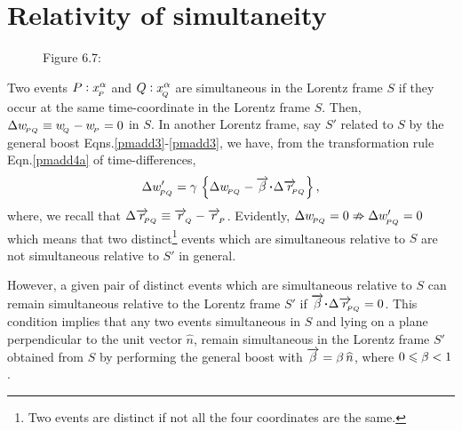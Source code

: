 \section{Relativity of simultaneity}
%
\begin {figure}[ht]
\begin{center}
\end{center}
\caption*{Figure 6.7:}\label{fig6.7}
 \end{figure}
 
 Two events  $P : x^{{\alpha}}_{_{\hspace*{-1.5pt}{P}}}$ and $Q: 
x^{{\alpha}}_{_{\hspace*{-1.5pt}{Q}}}$ 
are {simultaneous} in the Lorentz frame $S$ if they 
occur 
at the same time-coordinate in the Lorentz frame $S$. 
Then, $\Delta w_{_{\hspace*{-1.5pt}{PQ}}}\equiv w_{_{\hspace*{-1.5pt}{Q}}}-w_{_{\hspace*{-1.5pt}{P}}}=0$ 
in 
$S$. In another Lorentz frame, say $S'$ related to $S$ 
by 
the general boost Eqns.\eqref{pmadd3}-\eqref{pmadd3}, 
we 
have, from the transformation rule Eqn.\eqref{pmadd4a} 
of 
time-differences,
\begin{align}\label{pm8}
\Delta w'_\sfx{PQ}=\gkg\,\left\{\Delta 
w_\sfx{PQ}-\veca{\gkb}
\dotp\Delta \veca{r}_\sfx{\nnt PQ}\right\},
\end{align}
where, we recall that $\Delta \overrightarrow{r}_{_{\hspace*{-1.5pt}{\negthinspace\negthinspace 
PQ}}}\equiv 
\overrightarrow{r}_{_{\hspace*{-1.5pt}{Q}}} - \overrightarrow{r}_{_{\hspace*{-1.5pt}{P}}}$. Evidently,  
$\Delta 
w_{_{\hspace*{-1.5pt}{PQ}}} =0 \nRightarrow \Delta w'_{_{\hspace*{-1.5pt}{PQ}}} =0$ 
which 
means that two {distinct}\footnote{Two events are 
distinct 
if not all the four coordinates are the same.} events 
which 
are simultaneous relative to $S$ are not simultaneous 
relative to $S'$ {in general}. 

However, a given pair of distinct events which are 
simultaneous relative to $S$ can remain simultaneous 
relative to the Lorentz frame $S'$ if $\veca{\gkb} 
\dotp\Delta  \veca{r}_\sfx{\nnt PQ}=0$. This condition 
implies 
that any two events simultaneous in $S$ and lying on a 
plane 
perpendicular to the unit vector $\hat{n}$, remain 
simultaneous in the Lorentz frame $S'$  obtained from 
$S$ 
by performing the general boost with  $\overrightarrow{{\beta}}= 
{\beta}\, 
{\widehat{n}}$, where  $0\leqslant{\beta} <1$.

